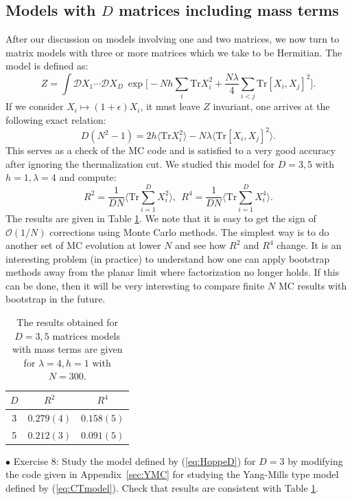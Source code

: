 \documentclass[letter,11pt]{article}
\begin{document}
\subsection{\label{subsec:ext_Hoppe}Models with $D$ matrices including mass terms}
After our discussion on models involving one and two matrices, we now turn to matrix models 
with three or more matrices which we take to be Hermitian. The model is defined as:
\begin{equation}
\label{eq:HoppeD} 
	Z = \int \mathcal{D}X_1 \cdots \mathcal{D}X_D ~
	\exp\Big[ -Nh\sum_{i}\mbox{Tr}X_{i}^{2} + \frac{N\lambda}{4} \sum_{i < j} \mbox{Tr} [X_i,X_j]^{2}\Big]. 
\end{equation}
If we consider $X_i \mapsto (1+\epsilon) X_i$, it must leave $Z$ invariant, one arrives at the following exact relation: 
\begin{equation}
	D(N^2 -1) = 2 h \langle \mbox{Tr}X_{i}^{2} \rangle 
	- N \lambda \langle \mbox{Tr}[X_i,X_j]^{2} \rangle. 
\end{equation}
This serves as a check of the MC code and is satisfied to a very good accuracy
after ignoring the thermalization cut. We studied this model for $D=3,5$ with 
$h=1, \lambda=4$ and compute: 
\begin{equation}
\label{eq:R2R4} 
	R^2  =   \frac{1}{DN} \Bigg \langle \mbox{Tr} \sum_{i=1}^{D} X_{i}^2 \bigg \rangle, 
	~~ R^4  =   \frac{1}{DN} \Bigg \langle \mbox{Tr} \sum_{i=1}^{D} X_{i}^4 \bigg \rangle.  
\end{equation}
The results are given in Table \ref{table:D_YMM_data}. We note that it is easy to get the sign of 
$\mathcal{O}(1/N)$ corrections using Monte Carlo methods. The simplest way is to do another set of MC evolution 
at lower $N$ and see how $R^2$ and $R^4$ change. It is an interesting problem 
(in practice) to understand how one can apply bootstrap methods away from the planar limit where factorization no longer holds.
If this can be done, then it will be very interesting to compare finite $N$ MC results with bootstrap in the future. 
\begin{table}[h!]
	\centering
	\begin{tabular}{||c c c||} 
		\hline
		$D$ & $ R^2$ & $R^4$ \\ [0.5ex] 
		\hline\hline
		3 & $ 0.279(4) $ & $ 0.158(5) $  \\ 
		5 & $ 0.212(3) $ & $ 0.091(5) $
		 \\ [1ex] 
		\hline 
	\end{tabular}
\caption{The results obtained for $D = 3,5$ matrices models with mass terms are given for $\lambda=4, h=1$ with $N=300$.}
\label{table:D_YMM_data}
\end{table}
\begin{mdframed}[backgroundcolor=blue!3] 
	$\bullet$ Exercise 8: Study the model defined by (\ref{eq:HoppeD}) for $D=3$ by modifying the code given in Appendix~\ref{sec:YMC} for studying the Yang-Mills type model defined by (\ref{eq:CTmodel}). Check that results are consistent with Table \ref{table:D_YMM_data}.  
\end{mdframed}
\end{document}
